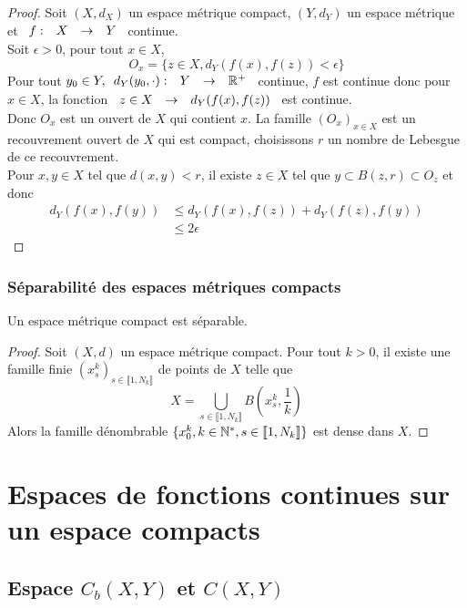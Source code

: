 \documentclass[]{report}
\begin{document}
    \begin{proof}
        Soit $(X,d_X)$ un espace métrique compact, $(Y,d_Y)$ un espace métrique et $\begin{array}{ccccc} f : & X & \to & Y \end{array}$ continue.\\
        Soit $\epsilon>0$, pour tout $x\in X$,
        \[O_x=\{z\in X,d_Y(f(x),f(z))<\epsilon\}\]
        Pour tout $y_0\in Y, \begin{array}{ccccc} d_Y(y_0,\cdot) : & Y & \to & \mathbb{R}^+ \end{array}$ continue, $f$ est continue donc pour $x\in X$, la fonction $\begin{array}{ccccc} z\in X & \to & d_Y(f(x),f(z)) \end{array}$ est continue.\\
        Donc $O_x$ est un ouvert de $X$ qui contient $x$. La famille $(O_x)_{x\in X}$ est un recouvrement ouvert de $X$ qui est compact, choisissons $r$ un nombre de Lebesgue de ce recouvrement.\\
        Pour $x,y\in X$ tel que $d(x,y)<r$, il existe $z\in X$ tel que $y\subset B(z,r)\subset O_z$ et donc
        \begin{align*}
            d_Y(f(x),f(y))&\le d_Y(f(x),f(z))+d_Y(f(z),f(y))\\
            &\le 2\epsilon
        \end{align*}
    \end{proof}

    \subsection*{Séparabilité des espaces métriques compacts}

    \begin{prop}{}{}
        Un espace métrique compact est séparable.
    \end{prop}

    \begin{proof}
        Soit $(X,d)$ un espace métrique compact. Pour tout $k>0$, il existe une famille finie $(x_s^k)_{s\in\llbracket1,N_k\rrbracket}$ de points de $X$ telle que
        \[X=\bigcup_{s\in\llbracket 1,N_k\rrbracket} B(x_s^k,\frac{1}{k})\]
        Alors la famille dénombrable $\{x_0^k,k\in \mathbb{N}^*,s\in \llbracket 1,N_k\rrbracket\}$ est dense dans $X$.
    \end{proof}

    \chapter{Espaces de fonctions continues sur un espace compacts}

    \section{Espace $C_b(X,Y)$ et $C(X,Y)$}
\end{document}
